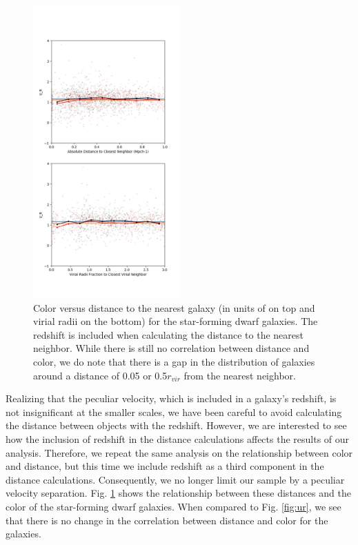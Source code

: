 \begin{figure}
    \includegraphics[width=0.5\textwidth]{Images/smallScaleEnvironment/dwarf_ur_xyz}
    \caption[Color versus distance calculated with redshift]{Color versus 
    distance to the nearest galaxy (in units of \hMpc on top and virial radii on 
    the bottom) for the star-forming dwarf galaxies.  The redshift is included 
    when calculating the distance to the nearest neighbor.  While there is still 
    no correlation between distance and color, we do note that there is a gap in 
    the distribution of galaxies around a distance of 0.05 \hMpc or 0.5$r_{vir}$ 
    from the nearest neighbor.}
    \label{fig:ur_xyz}
\end{figure}

Realizing that the peculiar velocity, which is included in a galaxy's redshift, 
is not insignificant at the smaller scales, we have been careful to avoid 
calculating the distance between objects with the redshift.  However, we are 
interested to see how the inclusion of redshift in the distance calculations 
affects the results of our analysis.  Therefore, we repeat the same analysis on 
the relationship between color and distance, but this time we include redshift 
as a third component in the distance calculations.  Consequently, we no longer 
limit our sample by a peculiar velocity separation.  Fig. \ref{fig:ur_xyz} shows 
the relationship between these distances and the color of the star-forming dwarf 
galaxies.  When compared to Fig. \ref{fig:ur}, we see that there is no change in 
the correlation between distance and color for the galaxies.  

